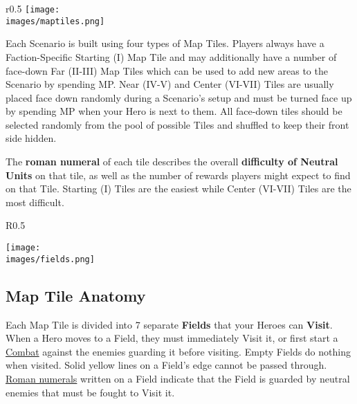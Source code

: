 
\bigskip

\begin{wrapfigure}{r}{0.5\textwidth}
  \texttt{[image: \\images/maptiles.png]}
\end{wrapfigure}
Each Scenario is built using four types of Map Tiles.
Players always have a Faction-Specific Starting (I) Map Tile and may additionally have a number of face-down Far (II-III) Map Tiles which can be used to add new areas to the Scenario by spending MP.
Near (IV-V) and Center (VI-VII) Tiles are usually placed face down randomly during a Scenario’s setup and must be turned face up by spending MP when your Hero is next to them.
All face-down tiles should be selected randomly from the pool of possible Tiles and shuffled to keep their front side hidden.\par
The \textbf{roman numeral} of each tile describes the overall \textbf{difficulty of Neutral Units} on that tile, as well as the number of rewards players might expect to find on that Tile.
Starting (I) Tiles are the easiest while Center (VI-VII) Tiles are the most difficult.\par
\par

\begin{wrapfigure}{R}{0.5\textwidth}
  \begin{center}
  \texttt{[image: \\images/fields.png]}
  \end{center}
\end{wrapfigure}
\subsection*{Map Tile Anatomy}
Each Map Tile is divided into 7 separate \textbf{Fields} that your Heroes can \textbf{Visit}.
When a Hero moves to a Field, they must immediately Visit it, or
first start a \hyperlink{Combat}{Combat} against the enemies guarding it before visiting.
Empty Fields do nothing when visited.
Solid yellow lines on a Field's edge cannot be passed through.
\hyperlink{Difficulty}{Roman numerals} written on a Field indicate that the Field is guarded by neutral enemies that must be fought to Visit it.\par

\clearpage

